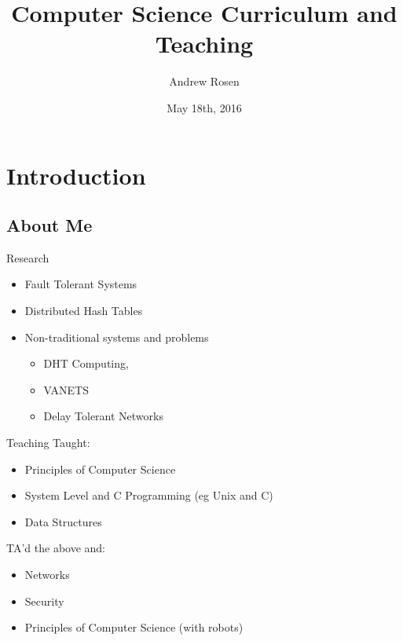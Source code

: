 \documentclass[11pt]{beamer}
\author{Andrew Rosen}
\title[Teaching Experiences]{Computer Science Curriculum and Teaching}
\date{May 18th, 2016}
\begin{document}
	
	
	
\maketitle


\section{Introduction}

\subsection{About Me}

\begin{frame}{Research}
	\begin{itemize}
		\item Fault Tolerant Systems
		\item Distributed Hash Tables
		\item  Non-traditional systems and problems 
		\begin{itemize}
			\item DHT Computing, 
			\item VANETS
			\item Delay Tolerant Networks
		\end{itemize}
	\end{itemize}
\end{frame}


\begin{frame}{Teaching}
	Taught:
	\begin{itemize}
		\item Principles of Computer Science
		\item System Level and C Programming (eg Unix and C)
		\item Data Structures
	\end{itemize}
	
	TA'd the above and:
	\begin{itemize}
		\item Networks
		\item Security
		\item Principles of Computer Science (with robots)
	\end{itemize}
\end{frame}
\end{document}
